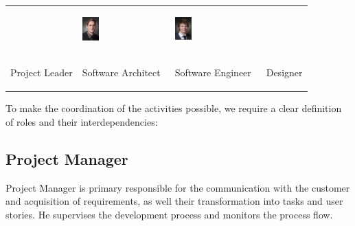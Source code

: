 \begin{table}[h]
\begin{tabular}{p{}p{}p{}p{}}
&
\vspace{-1cm}\begin{center}\includegraphics[width=0.2\textwidth]{res/intro/Simon.png}\end{center}
&
\vspace{-1cm}\begin{center}\includegraphics[width=0.2\textwidth]{res/intro/Ich.png}\end{center}
\\
\vspace{-1cm}\begin{center}Project Leader\end{center} & 
\vspace{-1cm}\begin{center}Software Architect\end{center} & 
\vspace{-1cm}\begin{center}Software Engineer\end{center} &
\vspace{-1cm}\begin{center}Designer \end{center}
\end{tabular}
\end{table}

To make the coordination of the activities possible, we require a clear
definition of roles and their interdependencies:

\subsection{Project Manager}
Project Manager is primary responsible for the communication with the customer
and acquisition of requirements, as well their transformation into tasks and
user stories. He supervises the development process and monitors the process
flow.

